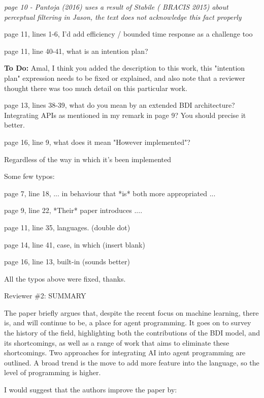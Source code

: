 \documentclass[12pt]{article}
\newenvironment{reviews}{\bigskip\itshape}{\upshape\bigskip}
\newenvironment{response}{\bigskip\normalfont}{\bigskip}
\newcommand{\tbd}[1]{\textsf{\textbf{To Do:} #1}}
\begin{document}
\begin{reviews}
page 10 - Pantoja (2016) uses a result of Stabile ( BRACIS 2015) about perceptual
filtering in Jason, the text does not acknowledge this fact properly

page 11, lines 1-6, I'd add efficiency / bounded time response as a
challenge too

page 11, line 40-41, what is an intention plan?

\begin{response}
\tbd{Amal, I think you added the description to this work, this "intention plan" expression needs to be fixed or explained, and also note that a reviewer thought there was too much detail on this particular work.}
\end{response}

page 13, lines 38-39, what do you mean by an extended BDI
architecture? Integrating APIs as mentioned in my remark in page 9?
You should precise it better.

page 16, line 9, what does it mean "However implemented"?

\begin{response}
Regardless of the way in which it's been implemented
\end{response}

Some few typos:

page 7, line 18, ... in behaviour that *is* both more appropriated ...

page 9, line 22, *Their* paper introduces ....

page 11, line 35, languages. (double dot)

page 14, line 41, case, in which (insert blank)

page 16, line 13, built-in (sounds better)

\begin{response}
All the typos above were fixed, thanks.
\end{response}


Reviewer \#2: SUMMARY 

The paper briefly argues that, despite the recent focus on machine learning, there is, and will continue to be, a place for agent programming. It goes on to survey the history of the field, highlighting both the contributions of the BDI model, and its shortcomings, as well as a range of work that aims to eliminate these shortcomings. Two approaches for integrating AI into agent programming are outlined. A broad trend is the move to add more feature into the language, so the level of programming is higher.

I would suggest that the authors improve the paper by:


\end{reviews}
\end{document}
